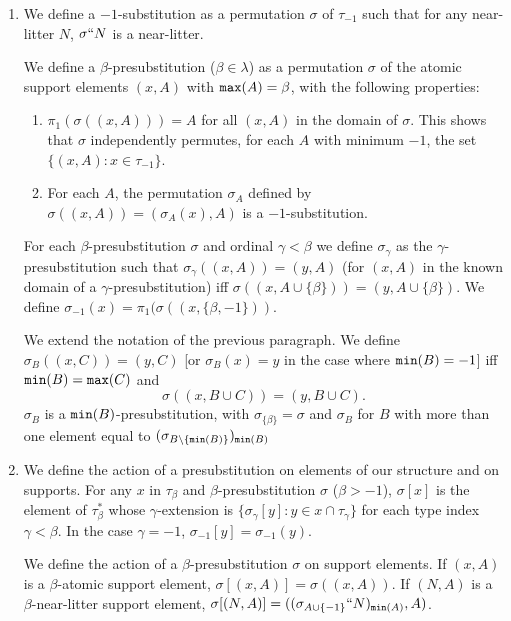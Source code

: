\documentclass[12pt]{article}
\begin{document}
\begin{enumerate}
\item We define a $-1$-substitution as a permutation $\sigma$ of $\tau_{-1}$ such that for any near-litter $N$, $\sigma``N$ is a near-litter.

We define a $\beta$-presubstitution ($\beta\in \lambda$) as a permutation $\sigma$ of the atomic support elements $(x,A)$ with ${\tt max}(A)=\beta$, with the following properties:

\begin {enumerate}

\item $\pi_1(\sigma((x,A))) = A$ for all $(x,A)$ in the domain of $\sigma$.  This shows that $\sigma$ independently permutes, for each $A$ with minimum $-1$, the set $\{(x,A):x \in \tau_{-1}\}$.

\item For each $A$, the permutation $\sigma_A$ defined by $\sigma((x,A)) = (\sigma_A(x),A)$ is a $-1$-substitution.

\end{enumerate}

For each $\beta$-presubstitution $\sigma$ and ordinal $\gamma<\beta$ we define $\sigma_\gamma$ as the $\gamma$-presubstitution such that $\sigma_\gamma((x,A)) = (y,A)$ (for $(x,A)$ in the known domain of a $\gamma$-presubstitution) iff $\sigma((x,A \cup \{\beta\})) = (y,A \cup \{\beta\})$.
We define $\sigma_{-1}(x) = \pi_1(\sigma((x,\{\beta,-1\}))$.

We extend the notation of the previous paragraph.  We define $\sigma_B((x,C)) = (y,C)$ [or $\sigma_B(x)=y$ in the case where ${\tt min}(B)=-1$] iff ${\tt min}(B) = {\tt max}(C)$  and $$\sigma((x,B \cup C)) = (y,B \cup C).$$  $\sigma_B$ is a ${\tt min}(B)$-presubstitution, with $\sigma_{\{\beta\}} = \sigma$ and $\sigma_B$ for $B$ with more than one element
equal to $(\sigma_{B \setminus \{{\tt min}(B)\}})_{{\tt min}(B)}$

\item  We define the action of a presubstitution on elements of our structure and on supports.  For any $x$ in $\tau_\beta$ and $\beta$-presubstitution $\sigma$ ($\beta>-1$), $\sigma[x]$ is the element of $\tau^*_\beta$ whose $\gamma$-extension is $\{\sigma_\gamma[y]:y \in x \cap \tau_\gamma\}$ for each type index $\gamma<\beta$.  In
the case $\gamma=-1$, $\sigma_{-1}[y] = \sigma_{-1}(y)$.

We define the action of a $\beta$-presubstitution $\sigma$ on support elements.  If $(x,A)$ is a $\beta$-atomic support element, $\sigma[(x,A)] = \sigma((x,A))$.  If $(N,A)$ is a $\beta$-near-litter support element, $\sigma[(N,A)] = ((\sigma_{A \cup \{-1\}}``N)_{{\tt min}(A)},A)$.


\end{enumerate}
\end{document}
